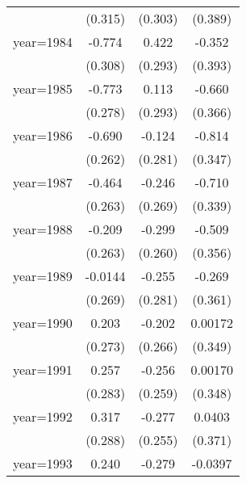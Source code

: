 {\begin{tabular}{l*{3}{c}}
                    &     (0.315)         &     (0.303)         &     (0.389)         \\
[1em]
year=1984           &      -0.774\sym{*}  &       0.422         &      -0.352         \\
                    &     (0.308)         &     (0.293)         &     (0.393)         \\
[1em]
year=1985           &      -0.773\sym{**} &       0.113         &      -0.660         \\
                    &     (0.278)         &     (0.293)         &     (0.366)         \\
[1em]
year=1986           &      -0.690\sym{*}  &      -0.124         &      -0.814\sym{*}  \\
                    &     (0.262)         &     (0.281)         &     (0.347)         \\
[1em]
year=1987           &      -0.464         &      -0.246         &      -0.710\sym{*}  \\
                    &     (0.263)         &     (0.269)         &     (0.339)         \\
[1em]
year=1988           &      -0.209         &      -0.299         &      -0.509         \\
                    &     (0.263)         &     (0.260)         &     (0.356)         \\
[1em]
year=1989           &     -0.0144         &      -0.255         &      -0.269         \\
                    &     (0.269)         &     (0.281)         &     (0.361)         \\
[1em]
year=1990           &       0.203         &      -0.202         &     0.00172         \\
                    &     (0.273)         &     (0.266)         &     (0.349)         \\
[1em]
year=1991           &       0.257         &      -0.256         &     0.00170         \\
                    &     (0.283)         &     (0.259)         &     (0.348)         \\
[1em]
year=1992           &       0.317         &      -0.277         &      0.0403         \\
                    &     (0.288)         &     (0.255)         &     (0.371)         \\
[1em]
year=1993           &       0.240         &      -0.279         &     -0.0397         \\

\end{tabular}}
